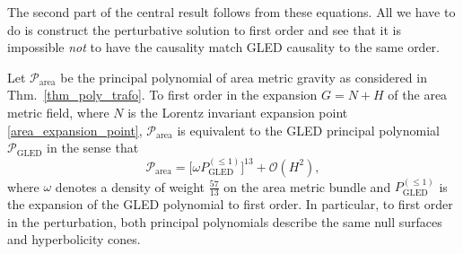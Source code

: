 The second part of the central result follows from these equations. All we have to do is construct the perturbative solution to first order and see that it is impossible \emph{not} to have the causality match GLED causality to the same order.

\begin{theorem}
  Let $\mathcal P_\text{area}$ be the principal polynomial of area metric gravity as considered in Thm.~\ref{thm_poly_trafo}. To first order in the expansion $G = N + H$ of the area metric field, where $N$ is the Lorentz invariant expansion point \eqref{area_expansion_point}, $\mathcal P_\text{area}$ is equivalent to the GLED principal polynomial $\mathcal P_\text{GLED}$ in the sense that
  \begin{equation}\label{eq_thm_poly}
    \mathcal P_\text{area} = \lbrack \omega P_\text{GLED}^{(\leq 1)}\rbrack^{13} + \mathcal O(H^2),
  \end{equation}
  where $\omega$ denotes a density of weight $\frac{57}{13}$ on the area metric bundle and $P_\text{GLED}^{(\leq 1)}$ is the expansion of the GLED polynomial to first order. In particular, to first order in the perturbation, both principal polynomials describe the same null surfaces and hyperbolicity cones.
\end{theorem}
